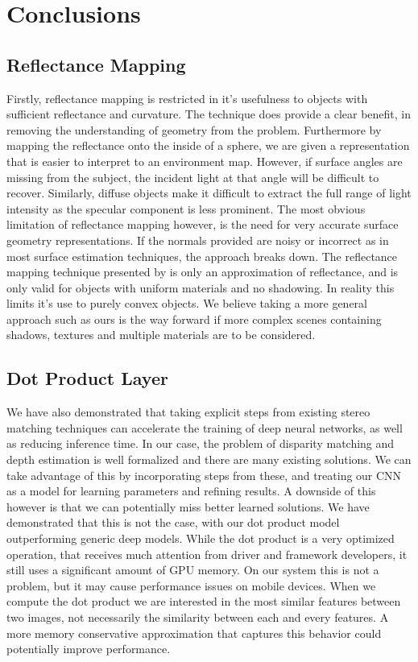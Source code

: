 \documentclass[ %
                    author={Gavin Parker},
                supervisor={Dr. Neill Campbell},
                    degree={MEng},
                     title={Deep Learning for Illumination Estimation from Stereo Images},
                  subtitle={},
                      type={Research},
                      year={2018} ]{dissertation}
\begin{document}
\section{Conclusions}
\subsection{Reflectance Mapping}
Firstly, reflectance mapping is restricted in it's usefulness to objects with sufficient reflectance and curvature. The technique does provide a clear benefit, in removing the understanding of geometry from the problem. Furthermore by mapping the reflectance onto the inside of a sphere, we are given a representation that is easier to interpret to an environment map. However, if surface angles are missing from the subject, the incident light at that angle will be difficult to recover. Similarly, diffuse objects make it difficult to extract the full range of light intensity as the specular component is less prominent. The most obvious limitation of reflectance mapping however, is the need for very accurate surface geometry representations. If the normals provided are noisy or incorrect as in most surface estimation techniques, the approach breaks down. The reflectance mapping technique presented by \cite{RematasCVPR2016} is only an approximation of reflectance, and is only valid for objects with uniform materials and no shadowing. In reality this limits it's use to purely convex objects. We believe taking a more general approach such as ours is the way forward if more complex scenes containing shadows, textures and multiple materials are to be considered.
\subsection{Dot Product Layer}
We have also demonstrated that taking explicit steps from existing stereo matching techniques can accelerate the training of deep neural networks, as well as reducing inference time. In our case, the problem of disparity matching and depth estimation is well formalized and there are many existing solutions. We can take advantage of this by incorporating steps from these, and treating our CNN as a model for learning parameters and refining results. A downside of this however is that we can potentially miss better learned solutions. We have demonstrated that this is not the case, with our dot product model outperforming generic deep models. While the dot product is a very optimized operation, that receives much attention from driver and framework developers, it still uses a significant amount of GPU memory. On our system this is not a problem, but it may cause performance issues on mobile devices. When we compute the dot product we are interested in the most similar features between two images, not necessarily the similarity between each and every features. A more memory conservative approximation that captures this behavior could potentially improve performance.
\end{document}
